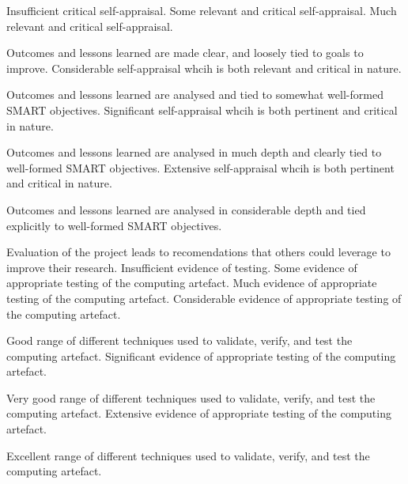 \begin{markingrubric}
%
        \grade\fail  	Insufficient critical self-appraisal.
        \grade		Some relevant and critical self-appraisal.
        \grade		Much relevant and critical self-appraisal.
        \par		Outcomes and lessons learned are made clear, and loosely tied to goals to improve.
        \grade		Considerable self-appraisal whcih is both relevant and critical in nature.
        \par		Outcomes and lessons learned are analysed and tied to somewhat well-formed SMART objectives.
        \grade		Significant self-appraisal whcih is both pertinent and critical in nature.
        \par		Outcomes and lessons learned are analysed in much depth and clearly tied to well-formed SMART objectives.
        \grade		Extensive self-appraisal whcih is both pertinent and critical in nature.
        \par		Outcomes and lessons learned are analysed in considerable depth and tied explicitly to well-formed SMART objectives. 
       \par		Evaluation of the project leads to recomendations that others could leverage to improve their research. 
%
        \grade\fail       Insufficient evidence of testing.
        \grade		Some evidence of appropriate testing of the computing artefact.
        \grade		Much evidence of appropriate testing of the computing artefact.
        \grade		Considerable evidence of appropriate testing of the computing artefact.
        \par		Good range of different techniques used to validate, verify, and test the computing artefact.
        \grade		Significant evidence of appropriate testing of the computing artefact.
        \par		Very good range of different techniques used to validate, verify, and test the computing artefact.
        \grade		Extensive evidence of appropriate testing of the computing artefact.
        \par		Excellent range of different techniques used to validate, verify, and test the computing artefact.
\end{markingrubric}
